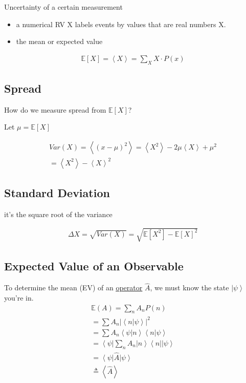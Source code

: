 \documentclass[
]{article}
\providecommand{\tightlist}{%
  \setlength{\itemsep}{0pt}\setlength{\parskip}{0pt}}
\let\oldhyperref\hyperref
\renewcommand{\hyperref}[2][]{\oldhyperref[#1]{\underline{#2}}}
\providecommand{\ket}[1]{\left\lvert #1 \right\rangle}
\providecommand{\bra}[1]{\left\langle #1 \right\rvert}
\providecommand{\braket}[1]{\left\langle #1 \right\rangle}
\begin{document}
Uncertainty of a certain measurement

\begin{itemize}
	\tightlist
	\item
	      a numerical RV X labels events by values that are real numbers X.
	\item
	      the mean or expected value
\end{itemize}

\begin{gather*}
	\mathbb{E}[X]=\braket{X}=\sum_X X\cdot P(x)
\end{gather*}

\subsection{Spread}\label{spread}

How do we measure spread from \(\mathbb{E}[X]\)?

Let \(\mu=\mathbb{E}[X]\)

\begin{gather*}
	Var(X)=\braket{(x-\mu)^2}=\braket{X^2}-2\mu\braket{X}+\mu^2\\
	=\braket{X^2}-\braket{X}^2
\end{gather*}

\subsection{Standard Deviation}\label{standard-deviation}

it's the square root of the variance

\begin{gather*}
	\Delta X=\sqrt{Var(X)}=\sqrt{\mathbb{E}[X^2]-\mathbb{E}[X]^2}
\end{gather*}

\subsection{Expected Value of an
	Observable}\label{expected-value-of-observables}

To determine the mean (EV) of an \hyperref[operators]{operator} \(\hat{A}\), we must know the state \(\ket{\psi}\) you're in.
\begin{gather*}
	\mathbb{E}(A)=\sum_nA_nP(n)\\
	=\sum A_n|\braket{n|\psi}|^2\\
	=\sum A_n\braket{\psi|n}\braket{n|\psi}\\
	=\bra{\psi}\sum_n A_n\ket{n}\bra{n}\ket{\psi}\\
	=\bra{\psi}\hat{A}\ket{\psi}\\
	\triangleq\braket{\hat{A}}
\end{gather*}
\end{document}
